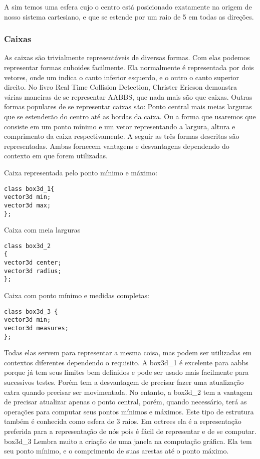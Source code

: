 A sim temos uma esfera cujo o centro está posicionado exatamente na origem de
nosso sistema cartesiano, e que se estende por um raio de 5 em todas as
direções.

\subsubsection{Caixas}

As caixas são trivialmente representáveis de diversas formas. Com elas podemos
representar formas cuboides facilmente. Ela normalmente é representada por dois
vetores, onde um indica o canto inferior esquerdo, e o outro o canto superior
direito. No livro Real Time Collision Detection, Christer Ericson demonstra
várias maneiras de se representar AABBS, que nada mais são que caixas.
Outras formas populares de se representar caixas são:
Ponto central mais meias larguras que se estenderão do centro até as bordas da caixa.
Ou a forma que usaremos que consiste em um ponto mínimo e um vetor
representando a largura, altura e comprimento da caixa respectivamente.
A seguir as três formas descritas são representadas. Ambas fornecem vantagens e
desvantagens dependendo do contexto em que forem utilizadas.

Caixa representada pelo ponto mínimo e máximo:

\begin{lstlisting}[frame=single,caption=Código de exemplo\label{codigo1}]
class box3d_1{
vector3d min;
vector3d max;
};
\end{lstlisting}

Caixa com meia larguras

\begin{lstlisting}[frame=single,caption=Código de exemplo\label{codigo1}]
class box3d_2
{
vector3d center;
vector3d radius;
};
\end{lstlisting}

Caixa com ponto mínimo e medidas completas:

\begin{lstlisting}[frame=single,caption=Código de exemplo\label{codigo1}]
class box3d_3 {
vector3d min;
vector3d measures;
};
\end{lstlisting}

Todas elas servem para representar a mesma coisa, mas podem ser utilizadas em
contextos diferentes dependendo o requisito. A box3d_1 é excelente para aabbs
porque já tem seus limites bem definidos e pode ser usado mais facilmente para
sucessivos testes. Porém tem a desvantagem de precisar fazer uma atualização
extra quando precisar ser movimentada.
No entanto, a box3d_2 tem a vantagem de precisar atualizar apenas o ponto
central, porém, quando necessário, terá as operações para computar seus pontos
mínimos e máximos. Este tipo de estrutura também é conhecida como esfera de 3
raios. Em octrees ela é a representação preferida para a representação de nós
pois é fácil de representar e de se computar.
box3d_3 Lembra muito a criação de uma janela na computação gráfica. Ela tem seu
ponto mínimo, e o comprimento de suas arestas até o ponto máximo.

